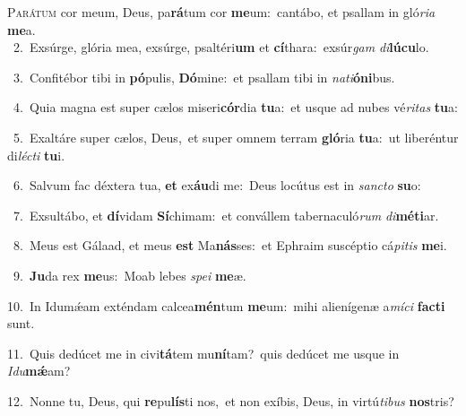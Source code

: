 \lettrine{\initial\textcolor{\initialcolor}{P}}{arátum} cor meum, Deus, pa\-\textbf{rá}\-tum cor \textbf{me}\-um:~\star cantábo, et psallam in gló\-\textit{ri}\-\textit{a} \textbf{me}\-a.\\
{\numbfont\textcolor{\numbcolor}{~2.}}~Exsúrge, glória mea, exsúrge, psaltéri\textbf{um} et \textbf{cí}\-thara:~\star exsúr\textit{gam} \textit{di}\-\textbf{lú}\textbf{cu}lo.\par
{\numbfont\textcolor{\numbcolor}{~3.}}~Confitébor tibi in \textbf{pó}\-pulis, \textbf{Dó}\-mine:~\star et psallam tibi in \textit{na}\-\textit{ti}\textbf{ó}\textbf{ni}bus.\par
{\numbfont\textcolor{\numbcolor}{~4.}}~Quia magna est super cælos miseri\-\textbf{cór}\-dia \textbf{tu}\-a:~\star et usque ad nubes vé\-\textit{ri}\-\textit{tas} \textbf{tu}\-a:\par
{\numbfont\textcolor{\numbcolor}{~5.}}~Exaltáre super cælos, Deus,~\dagger et super omnem terram \textbf{gló}\-ria \textbf{tu}\-a:~\star ut liberéntur di\-\textit{léc}\-\textit{ti} \textbf{tu}\-i.\par
{\numbfont\textcolor{\numbcolor}{~6.}}~Salvum fac déxtera tua, \textbf{et} ex\-\textbf{áu}\-di me:~\star Deus locútus est in \textit{sanc}\-\textit{to} \textbf{su}\-o:\par
{\numbfont\textcolor{\numbcolor}{~7.}}~Exsultábo, et \textbf{dí}\-vidam \textbf{Sí}\-chimam:~\star et convállem tabernaculó\textit{rum} \textit{di}\-\textbf{mé}\textbf{ti}ar.\par
{\numbfont\textcolor{\numbcolor}{~8.}}~Meus est Gálaad, et meus \textbf{est} Ma\-\textbf{nás}\-ses:~\star et Ephraim suscéptio cá\-\textit{pi}\-\textit{tis} \textbf{me}\-i.\par
{\numbfont\textcolor{\numbcolor}{~9.}}~\-\textbf{Ju}\-da rex \textbf{me}\-us:~\star Moab lebes \textit{spe}\-\textit{i} \textbf{me}\-æ.\par
{\numbfont\textcolor{\numbcolor}{10.}}~In Idumǽam exténdam calcea\-\textbf{mén}\-tum \textbf{me}\-um:~\star mihi alienígenæ a\-\textit{mí}\-\textit{ci} \textbf{fac}\-\textbf{ti} sunt.\par
{\numbfont\textcolor{\numbcolor}{11.}}~Quis dedúcet me in civi\-\textbf{tá}\-tem mu\-\textbf{ní}\-tam?~\star quis dedúcet me usque in \textit{I}\-\textit{du}\textbf{mǽ}am?\par
{\numbfont\textcolor{\numbcolor}{12.}}~Nonne tu, Deus, qui \textbf{re}\-pu\-\textbf{lís}\-ti nos,~\star et non exíbis, Deus, in virtú\-\textit{ti}\-\textit{bus} \textbf{nos}\-tris?\par
